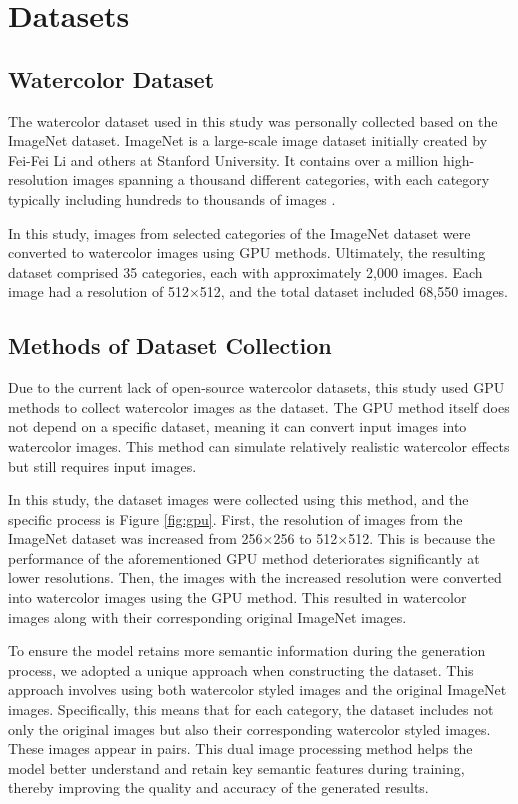 \documentclass{acsman}
\begin{document}
\section{Datasets}\label{sec:dataset}
\subsection{Watercolor Dataset}
The watercolor dataset used in this study was personally collected based on the ImageNet dataset. ImageNet is a large-scale image dataset initially created by Fei-Fei Li and others at Stanford University. It contains over a million high-resolution images spanning a thousand different categories, with each category typically including hundreds to thousands of images \cite{deng2009imagenet}. 

In this study, images from selected categories of the ImageNet dataset were converted to watercolor images using GPU methods. Ultimately, the resulting dataset comprised 35 categories, each with approximately 2,000 images. Each image had a resolution of 512$\times$512, and the total dataset included 68,550 images.


\subsection{Methods of Dataset Collection}

Due to the current lack of open-source watercolor datasets, this study used GPU methods to collect watercolor images as the dataset. The GPU method itself does not depend on a specific dataset, meaning it can convert input images into watercolor images. This method can simulate relatively realistic watercolor effects but still requires input images.

In this study, the dataset images were collected using this method, and the specific process is Figure \ref{fig:gpu}. First, the resolution of images from the ImageNet dataset was increased from 256$\times$256 to 512$\times$512. This is because the performance of the aforementioned GPU method deteriorates significantly at lower resolutions. Then, the images with the increased resolution were converted into watercolor images using the GPU method. This resulted in watercolor images along with their corresponding original ImageNet images.


To ensure the model retains more semantic information during the generation process, we adopted a unique approach when constructing the dataset. This approach involves using both watercolor styled images and the original ImageNet images. Specifically, this means that for each category, the dataset includes not only the original images but also their corresponding watercolor styled images. These images appear in pairs. This dual image processing method helps the model better understand and retain key semantic features during training, thereby improving the quality and accuracy of the generated results.
\end{document}
